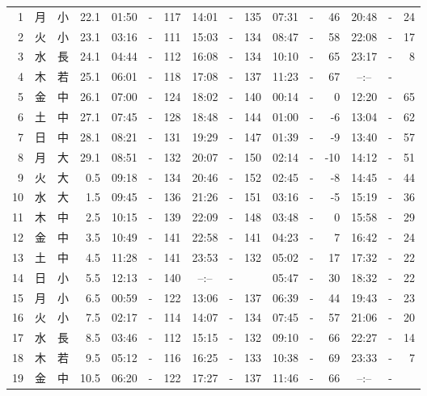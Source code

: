 \documentclass[12pt.a4j]{jsarticle}
\begin{document}
\begin{center}
\begin{table}[ht]
\begin{tabular}{|rc|cr|ccrccr|ccrccr|}
 \hline
 1 & 月 & 小 & 22.1 &  01:50 &-& 117  &  14:01 &-& 135  &   07:31 &-&  46  &   20:48 &-&  24  \\
 2 & 火 & 小 & 23.1 &  03:16 &-& 111  &  15:03 &-& 134  &   08:47 &-&  58  &   22:08 &-&  17  \\
 3 & 水 & 長 & 24.1 &  04:44 &-& 112  &  16:08 &-& 134  &   10:10 &-&  65  &   23:17 &-&   8  \\
 4 & 木 & 若 & 25.1 &  06:01 &-& 118  &  17:08 &-& 137  &   11:23 &-&  67  &   --:-- &-&     \\
 5 & 金 & 中 & 26.1 &  07:00 &-& 124  &  18:02 &-& 140  &   00:14 &-&   0  &   12:20 &-&  65  \\
 6 & 土 & 中 & 27.1 &  07:45 &-& 128  &  18:48 &-& 144  &   01:00 &-&  -6  &   13:04 &-&  62  \\
 7 & 日 & 中 & 28.1 &  08:21 &-& 131  &  19:29 &-& 147  &   01:39 &-&  -9  &   13:40 &-&  57  \\
 8 & 月 & 大 & 29.1 &  08:51 &-& 132  &  20:07 &-& 150  &   02:14 &-& -10  &   14:12 &-&  51  \\
 9 & 火 & 大 &  0.5 &  09:18 &-& 134  &  20:46 &-& 152  &   02:45 &-&  -8  &   14:45 &-&  44  \\
10 & 水 & 大 &  1.5 &  09:45 &-& 136  &  21:26 &-& 151  &   03:16 &-&  -5  &   15:19 &-&  36  \\
11 & 木 & 中 &  2.5 &  10:15 &-& 139  &  22:09 &-& 148  &   03:48 &-&   0  &   15:58 &-&  29  \\
12 & 金 & 中 &  3.5 &  10:49 &-& 141  &  22:58 &-& 141  &   04:23 &-&   7  &   16:42 &-&  24  \\
13 & 土 & 中 &  4.5 &  11:28 &-& 141  &  23:53 &-& 132  &   05:02 &-&  17  &   17:32 &-&  22  \\
14 & 日 & 小 &  5.5 &  12:13 &-& 140  &  --:-- &-&     &   05:47 &-&  30  &   18:32 &-&  22  \\
15 & 月 & 小 &  6.5 &  00:59 &-& 122  &  13:06 &-& 137  &   06:39 &-&  44  &   19:43 &-&  23  \\
16 & 火 & 小 &  7.5 &  02:17 &-& 114  &  14:07 &-& 134  &   07:45 &-&  57  &   21:06 &-&  20  \\
17 & 水 & 長 &  8.5 &  03:46 &-& 112  &  15:15 &-& 132  &   09:10 &-&  66  &   22:27 &-&  14  \\
18 & 木 & 若 &  9.5 &  05:12 &-& 116  &  16:25 &-& 133  &   10:38 &-&  69  &   23:33 &-&   7  \\
19 & 金 & 中 & 10.5 &  06:20 &-& 122  &  17:27 &-& 137  &   11:46 &-&  66  &   --:-- &-&     \\

\end{tabular}
\end{table}
\end{center}
\end{document}
